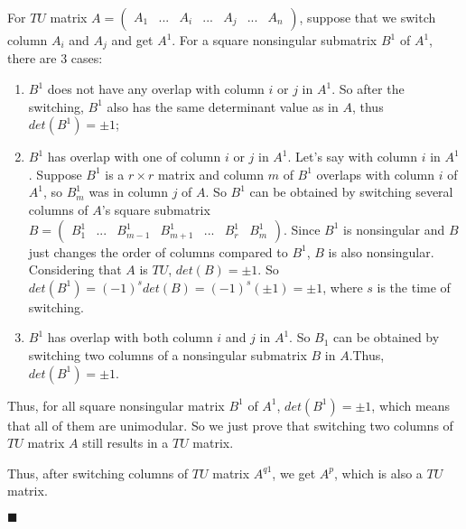 For $TU$ matrix $A=\left(\begin{array}{ccccccc} A_1 & ... & A_i & ... & A_j & ... & A_n \end{array}\right)$, suppose that we switch column $A_i$ and $A_j$ and get $A^1$. For a square nonsingular submatrix $B^1$ of $A^1$, there are 3 cases:
\begin{enumerate}
\item $B^1$ does not have any overlap with column $i$ or $j$ in $A^1$. So after the switching, $B^1$ also has the same determinant value as in $A$, thus $det(B^1)=\pm1$;
\item $B^1$ has overlap with one of column $i$ or $j$ in $A^1$. Let's say with column $i$ in $A^1$. Suppose $B^1$ is a $r\times{}r$ matrix and column $m$ of $B^1$ overlaps with column $i$ of $A^1$, so $B^1_m$ was in column $j$ of $A$. So $B^1$ can be obtained by switching several columns of $A$'s square submatrix $B=\left(\begin{array}{ccccccc} B^1_1 & ... & B^1_{m-1} & B^1_{m+1} & ... & B^1_r & B^1_{m} \end{array}\right)$. Since $B^1$ is nonsingular and $B$ just changes the order of columns compared to $B^1$, $B$ is also nonsingular. Considering that $A$ is $TU$,  $det(B)=\pm1$. So $det(B^1)=(-1)^sdet(B)=(-1)^s(\pm1)=\pm1$, where $s$ is the time of switching.
\item $B^1$ has overlap with both column $i$ and $j$ in $A^1$. So $B_1$ can be obtained by switching two columns of a nonsingular submatrix $B$ in $A$.Thus, $det(B^1)=\pm1$.
\end{enumerate}
Thus, for all square nonsingular matrix $B^1$ of $A^1$, $det(B^1)=\pm1$, which means that all of them are unimodular. So we just prove that switching two columns of $TU$ matrix $A$ still results in a $TU$ matrix.

Thus, after switching columns of $TU$ matrix $A^{q1}$, we get $A^p$, which is also a $TU$ matrix.
\begin{flushright} $\blacksquare$ \end{flushright}